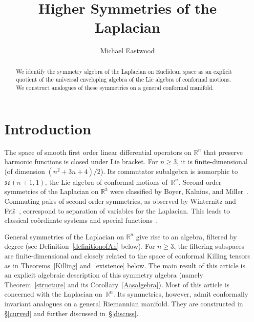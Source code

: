 \documentclass[a4paper,12pt]{amsart}
\begin{document}
\title{Higher Symmetries of the Laplacian}
\author[Michael Eastwood]{Michael Eastwood}
\address{Department of Pure Mathematics\\ University of Adelaide,\newline
         \indent South AUSTRALIA 5005}

\begin{abstract} We identify the symmetry algebra of the Laplacian on
Euclidean space as an explicit quotient of the universal enveloping algebra of
the Lie algebra of conformal motions. We construct analogues of these
symmetries on a general conformal manifold.
\end{abstract}

\maketitle

\renewcommand{\thefootnote}{}

\section{Introduction}
The space of smooth first order linear differential operators on
${\mathbb R}^n$ that preserve harmonic functions is closed under Lie bracket.
For $n\geq 3$, it is finite-dimensional (of dimension $(n^2+3n+4)/2$). Its
commutator subalgebra is isomorphic to ${\mathfrak{so}}(n+1,1)$, the Lie
algebra of conformal motions of~${\mathbb R}^n$. Second order symmetries
of the Laplacian on ${\mathbb R}^3$ were classified by Boyer, Kalnins, and
Miller~\cite{bkm}. Commuting pairs of second order symmetries, as observed by
Winternitz and Fri\v{s}~\cite{wf}, correspond to separation of variables for
the Laplacian. This leads to classical co\"ordinate systems and special
functions~\cite{bkm,miller}.

General symmetries of the Laplacian on ${\mathbb R}^n$ give rise to an algebra,
filtered by degree (see Definition~\ref{definitionofAn} below). For $n\geq 3$,
the filtering subspaces are finite-dimensional and closely related to the space
of conformal Killing tensors as in Theorems~\ref{Killing} and~\ref{existence}
below. The main result of this article is an explicit algebraic description of
this symmetry algebra (namely Theorem~\ref{structure} and its
Corollary~\ref{Aasalgebra}). Most of this article is concerned with the
Laplacian on~${\mathbb R}^n$. Its symmetries, however, admit conformally
invariant analogues on a general Riemannian manifold. They are constructed in
\S\ref{curved} and further discussed in~\S\ref{discuss}.
\end{document}
